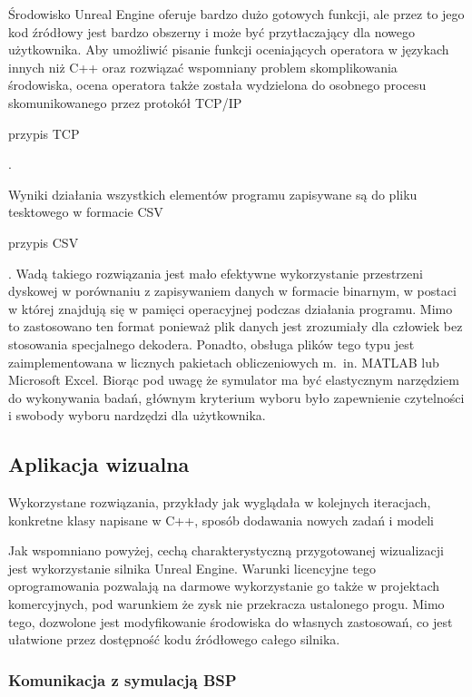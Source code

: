 Środowisko Unreal Engine oferuje bardzo dużo gotowych funkcji, ale przez to jego kod źródłowy jest bardzo obszerny i może być przytłaczający dla nowego użytkownika. Aby umożliwić pisanie funkcji oceniających operatora w językach innych niż C++ oraz rozwiązać wspomniany problem skomplikowania środowiska, ocena operatora także została wydzielona do osobnego procesu skomunikowanego przez protokół TCP/IP \begin{todo}przypis TCP\end{todo}.

Wyniki działania wszystkich elementów programu zapisywane są do pliku tesktowego w formacie CSV \begin{todo}przypis CSV\end{todo}. Wadą takiego rozwiązania jest mało efektywne wykorzystanie przestrzeni dyskowej w porównaniu z zapisywaniem danych w formacie binarnym, w postaci w której znajdują się w pamięci operacyjnej podczas działania programu. Mimo to zastosowano ten format ponieważ plik danych jest zrozumiały dla człowiek bez stosowania specjalnego dekodera. Ponadto, obsługa plików tego typu jest zaimplementowana w licznych pakietach obliczeniowych m.~in. MATLAB lub Microsoft Excel. Biorąc pod uwagę że symulator ma być elastycznym narzędziem do wykonywania badań, głównym kryterium wyboru było zapewnienie czytelności i swobody wyboru nardzędzi dla użytkownika.

\subsection{Aplikacja wizualna}
\begin{todo}
    Wykorzystane rozwiązania, przykłady jak wyglądała w kolejnych iteracjach, konkretne klasy napisane w C++, sposób dodawania nowych zadań i modeli
\end{todo}

Jak wspomniano powyżej, cechą charakterystyczną przygotowanej wizualizacji jest wykorzystanie silnika Unreal Engine. Warunki licencyjne tego oprogramowania pozwalają na darmowe wykorzystanie go także w projektach komercyjnych, pod warunkiem że zysk nie przekracza ustalonego progu. Mimo tego, dozwolone jest modyfikowanie środowiska do własnych zastosowań, co jest ułatwione przez dostępność kodu źródłowego całego silnika.

\subsubsection{Komunikacja z symulacją BSP}

